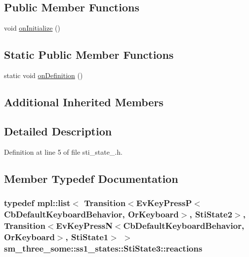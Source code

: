 \subsection*{Public Member Functions}
\begin{DoxyCompactItemize}
\item 
void \hyperlink{structsm__three__some_1_1ss1__states_1_1StiState3_a02103ab1163ba7e355994feff81271ba}{on\+Initialize} ()
\end{DoxyCompactItemize}
\subsection*{Static Public Member Functions}
\begin{DoxyCompactItemize}
\item 
static void \hyperlink{structsm__three__some_1_1ss1__states_1_1StiState3_a5af03d932733e1fdcba2e5f58c115efa}{on\+Definition} ()
\end{DoxyCompactItemize}
\subsection*{Additional Inherited Members}


\subsection{Detailed Description}


Definition at line 5 of file sti\+\_\+state\+\_.\+h.



\subsection{Member Typedef Documentation}
\subsubsection[{\texorpdfstring{reactions}{reactions}}]{\setlength{\rightskip}{0pt plus 5cm}typedef mpl\+::list$<$ Transition$<$Ev\+Key\+PressP$<$Cb\+Default\+Keyboard\+Behavior, {\bf Or\+Keyboard}$>$, {\bf Sti\+State2}$>$, Transition$<$Ev\+Key\+PressN$<$Cb\+Default\+Keyboard\+Behavior, {\bf Or\+Keyboard}$>$, {\bf Sti\+State1}$>$ $>$ {\bf sm\+\_\+three\+\_\+some\+::ss1\+\_\+states\+::\+Sti\+State3\+::reactions}}\hypertarget{structsm__three__some_1_1ss1__states_1_1StiState3_a2672f9f53573401ff5b62b95bf4d7b47}{}\label{structsm__three__some_1_1ss1__states_1_1StiState3_a2672f9f53573401ff5b62b95bf4d7b47}


